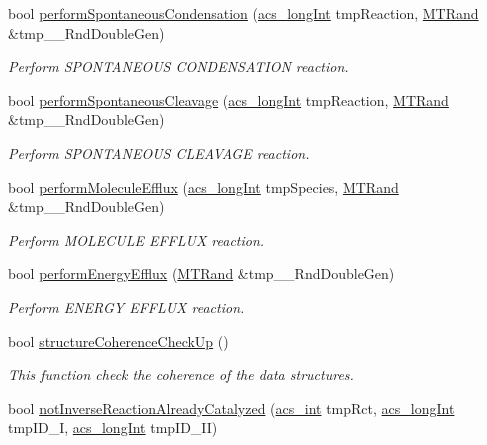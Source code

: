 \begin{DoxyCompactItemize}
bool \hyperlink{a00003_acc764a05297ae00db52360f3df5ed1d5}{perform\-Spontaneous\-Condensation} (\hyperlink{a00016_a19319d75f02db4308bc5c0026d98cd85}{acs\-\_\-long\-Int} tmp\-Reaction, \hyperlink{a00008}{M\-T\-Rand} \&tmp\-\_\-\-\_\-\-Rnd\-Double\-Gen)
\begin{DoxyCompactList}\small\item\em Perform S\-P\-O\-N\-T\-A\-N\-E\-O\-U\-S C\-O\-N\-D\-E\-N\-S\-A\-T\-I\-O\-N reaction. \end{DoxyCompactList}\item 
bool \hyperlink{a00003_a4949138a3771b7f6ec2bfe82cbad947e}{perform\-Spontaneous\-Cleavage} (\hyperlink{a00016_a19319d75f02db4308bc5c0026d98cd85}{acs\-\_\-long\-Int} tmp\-Reaction, \hyperlink{a00008}{M\-T\-Rand} \&tmp\-\_\-\-\_\-\-Rnd\-Double\-Gen)
\begin{DoxyCompactList}\small\item\em Perform S\-P\-O\-N\-T\-A\-N\-E\-O\-U\-S C\-L\-E\-A\-V\-A\-G\-E reaction. \end{DoxyCompactList}\item 
bool \hyperlink{a00003_ad072a40a7d9521379c7ff50ed8110fbe}{perform\-Molecule\-Efflux} (\hyperlink{a00016_a19319d75f02db4308bc5c0026d98cd85}{acs\-\_\-long\-Int} tmp\-Species, \hyperlink{a00008}{M\-T\-Rand} \&tmp\-\_\-\-\_\-\-Rnd\-Double\-Gen)
\begin{DoxyCompactList}\small\item\em Perform M\-O\-L\-E\-C\-U\-L\-E E\-F\-F\-L\-U\-X reaction. \end{DoxyCompactList}\item 
bool \hyperlink{a00003_aff7607e0f3a74790109a7d87de3031bd}{perform\-Energy\-Efflux} (\hyperlink{a00008}{M\-T\-Rand} \&tmp\-\_\-\-\_\-\-Rnd\-Double\-Gen)
\begin{DoxyCompactList}\small\item\em Perform E\-N\-E\-R\-G\-Y E\-F\-F\-L\-U\-X reaction. \end{DoxyCompactList}\item 
bool \hyperlink{a00003_a6606b08f25751a8796c13810962b385e}{structure\-Coherence\-Check\-Up} ()
\begin{DoxyCompactList}\small\item\em This function check the coherence of the data structures. \end{DoxyCompactList}\item 
bool \hyperlink{a00003_a5160dec152ed0369fe8af9aff3253a9e}{not\-Inverse\-Reaction\-Already\-Catalyzed} (\hyperlink{a00016_a8d277355641a098190360234e2ebde35}{acs\-\_\-int} tmp\-Rct, \hyperlink{a00016_a19319d75f02db4308bc5c0026d98cd85}{acs\-\_\-long\-Int} tmp\-I\-D\-\_\-\-I, \hyperlink{a00016_a19319d75f02db4308bc5c0026d98cd85}{acs\-\_\-long\-Int} tmp\-I\-D\-\_\-\-I\-I)

\end{DoxyCompactItemize}
